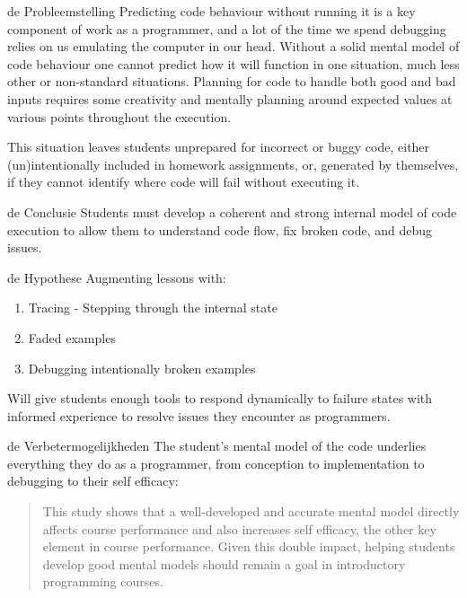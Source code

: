 \documentclass[final]{beamer}
\newlength{\colwidth}
\begin{document}
\begin{frame}[t,fragile]
\begin{columns}[t]
\begin{column}{\colwidth}
\begin{block}{de Probleemstelling}
    Predicting code behaviour without running it is a key component of work as a
    programmer, and a lot of the time we spend debugging relies on us emulating
    the computer in our head. Without a solid mental model of code behaviour
    one cannot predict how it will function in one situation, much less other or
    non-standard situations. Planning for code to handle both good and bad
    inputs requires some creativity and mentally planning around expected values
    at various points throughout the execution.

    This situation leaves students unprepared for incorrect or buggy code,
    either (un)intentionally included in homework assignments, or, generated by
    themselves, if they cannot identify where code will fail without executing
    it.

  \end{block}

  \begin{block}{de Conclusie}
    Students must develop a coherent and strong internal model of code execution
    to allow them to understand code flow, fix broken code, and debug issues.
  \end{block}

  \begin{alertblock}{de Hypothese}
    \large Augmenting lessons with:

  \begin{enumerate}
    \item Tracing - Stepping through the internal state
    \item Faded examples
    \item Debugging intentionally broken examples
  \end{enumerate}

    Will give students enough tools to respond dynamically to failure
    states with informed experience to resolve issues they encounter as programmers.
  \end{alertblock}

  \begin{block}{de Verbetermogelijkheden}
    The student's mental model of the code underlies everything they do as a programmer, from conception to implementation to debugging to their self efficacy:

      \begin{quote}
This study shows that a well-developed and accurate mental model directly
affects course performance and also increases self efficacy, the other key
element in course performance. Given this double impact, helping students
develop good mental models should remain a goal in introductory programming
courses.\cite{Ramalingam_2004}
    \end{quote}


\end{block}
\end{column}
\end{columns}
\end{frame}
\end{document}
